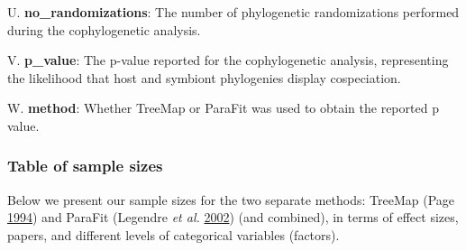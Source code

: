 \documentclass[
]{article}
\begin{document}
U. \textbf{no\_randomizations}: The number of phylogenetic
randomizations performed during the cophylogenetic analysis.

V. \textbf{p\_value}: The p-value reported for the cophylogenetic
analysis, representing the likelihood that host and symbiont phylogenies
display cospeciation.

W. \textbf{method}: Whether TreeMap or ParaFit was used to obtain the
reported p value.

\hypertarget{table-of-sample-sizes}{%
\subsubsection{Table of sample sizes}\label{table-of-sample-sizes}}

Below we present our sample sizes for the two separate methods: TreeMap
(Page \protect\hyperlink{ref-page1994parallel}{1994}) and ParaFit
(Legendre \emph{et al.}
\protect\hyperlink{ref-legendre2002statistical}{2002}) (and combined),
in terms of effect sizes, papers, and different levels of categorical
variables (factors).
\end{document}
